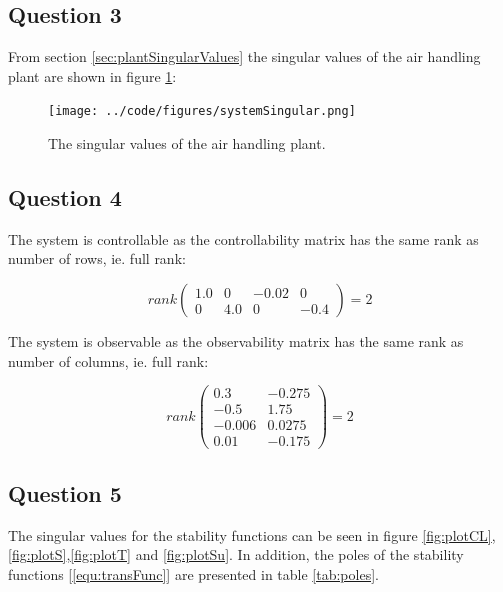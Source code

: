 \documentclass[a4paper, titlepage]{article}
\begin{document}
\subsection{Question 3}
From section \ref{sec:plantSingularValues} the singular values of the air handling plant are shown in figure \ref{fig:systemsingular}:


\begin{figure}[h!]
\center
\texttt{[image: ../code/figures/systemSingular.png]}
\caption{The singular values of the air handling plant.}
\label{fig:systemsingular}
\end{figure}


\subsection{Question 4}

The system is controllable as the controllability matrix has the same rank as number of rows, ie. full rank:

\begin{equation}
rank
\begin{pmatrix}
1.0 & 0 & -0.02 & 0 \\ 0 & 4.0 & 0 & -0.4
\end{pmatrix}
= 2
\label{equ:actual_contr}
\end{equation}


The system is observable as the observability matrix has the same rank as number of columns, ie. full rank:

\begin{equation}
rank
\begin{pmatrix}
0.3 & -0.275 \\ -0.5 & 1.75 \\ -0.006 & 0.0275 \\ 0.01 & -0.175
\end{pmatrix}
= 2
\label{equ:actual_observ}
\end{equation}


\subsection{Question 5}
The singular values for the stability functions can be seen in figure \ref{fig:plotCL},\ref{fig:plotS},\ref{fig:plotT} and \ref{fig:plotSu}.
In addition, the poles of the stability functions [\ref{equ:transFunc}] are presented in table \ref{tab:poles}.
\end{document}
